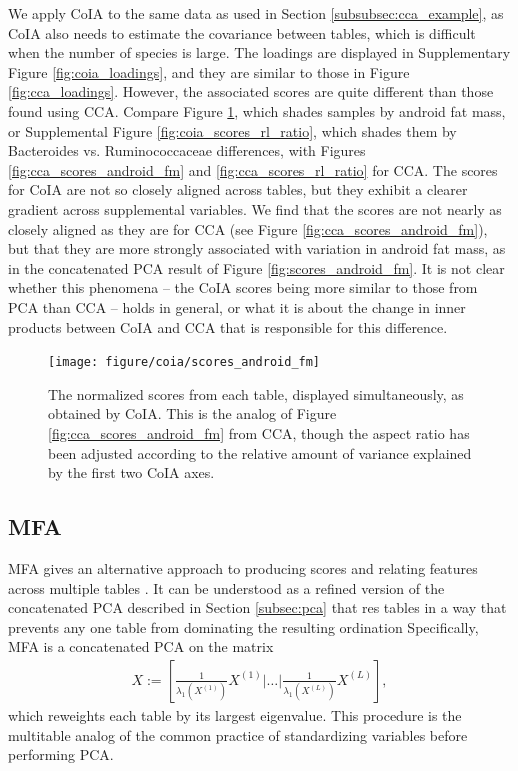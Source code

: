 \documentclass{article}
\begin{document}
We apply CoIA to the same data as used in Section \ref{subsubsec:cca_example},
as CoIA also needs to estimate the covariance between tables, which is difficult
when the number of species is large. The loadings are displayed in Supplementary
Figure \ref{fig:coia_loadings}, and they are similar to those in Figure
\ref{fig:cca_loadings}. However, the associated scores are quite different than
those found using CCA. Compare Figure \ref{fig:coia_scores_android_fm}, which
shades samples by android fat mass, or Supplemental Figure
\ref{fig:coia_scores_rl_ratio}, which shades them by Bacteroides vs.
Ruminococcaceae differences, with Figures \ref{fig:cca_scores_android_fm} and
\ref{fig:cca_scores_rl_ratio} for CCA. The scores for CoIA are not so closely
aligned across tables, but they exhibit a clearer gradient across supplemental
variables. We find that the scores are not nearly as closely aligned as they are
for CCA (see Figure \ref{fig:cca_scores_android_fm}), but that they are more
strongly associated with variation in android fat mass, as in the concatenated
PCA result of Figure \ref{fig:scores_android_fm}. It is not clear whether this
phenomena -- the CoIA scores being more similar to those from PCA than CCA --
holds in general, or what it is about the change in inner products between CoIA
and CCA that is responsible for this difference.

\begin{figure}
  \centering
  \texttt{[image: figure/coia/scores\_android\_fm]}
  \caption{The normalized scores from each table, displayed
    simultaneously, as obtained by CoIA. This is the analog of Figure
    \ref{fig:cca_scores_android_fm} from CCA, though the aspect ratio has been
    adjusted according to the relative amount of variance explained by the first
    two CoIA axes.
    \label{fig:coia_scores_android_fm} }
\end{figure}

\subsection{MFA}
\label{subsec:mfa}

MFA gives an alternative approach to producing scores and relating features
across multiple tables \citep{pages2014multiple}. It can be understood as a
refined version of the concatenated PCA described in Section \ref{subsec:pca}
that res tables in a way that prevents any one table from dominating the
resulting ordination Specifically, MFA is a concatenated PCA on the matrix
\begin{align*}
X := \left[\frac{1}{\lambda_{1}\left(X^{(1)}\right)}X^{(1)} \vert \dots
  \vert \frac{1}{\lambda_{1}\left(X^{(L)}\right)}X^{(L)}\right],
\end{align*}
which reweights each table by its largest eigenvalue. This procedure is the
multitable analog of the common practice of standardizing variables before
performing PCA.
\end{document}
